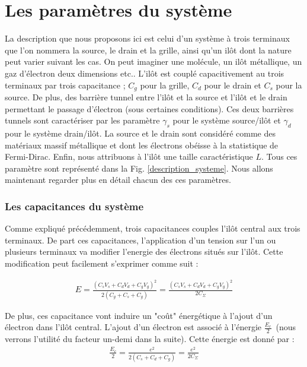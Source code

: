 \section{Les paramètres du système}
La description que nous proposons ici est celui d'un système à trois terminaux que l'on nommera la source, le drain et la grille, ainsi qu'un il\^ot dont la nature peut varier suivant les cas. On peut imaginer une molécule, un il\^ot métallique, un gaz d'électron deux dimensions etc.. L'il\^ot est couplé capacitivement au trois terminaux par trois capacitance ; $C_g$ pour la grille, $C_d$ pour le drain et $C_s$ pour la source. De plus, des barrière tunnel entre l'il\^ot et la source et l'il\^ot et le drain permettant le passage d'électron (sous certaines conditions). Ces deux barrières tunnels sont caractériser par les paramètre $\gamma_s$ pour le système source/il\^ot et $\gamma_d$ pour le système drain/il\^ot. La source et le drain sont considéré comme des matériaux massif métallique et dont les électrons obéisse à la statistique de Fermi-Dirac. Enfin, nous attribuons à l'il\^ot une taille caractéristique $L$. Tous ces paramètre sont représenté dans la Fig. \ref{description_systeme}. Nous allons maintenant regarder plus en détail chacun des ces paramètres.

\subsubsection{Les capacitances du système}
Comme expliqué précédemment, trois capacitances couples l'il\^ot central aux trois terminaux. De part ces capacitances, l'application d'un tension sur l'un ou plusieurs terminaux va modifier l'energie des électrons situés sur l'ilôt. Cette modification peut facilement s'exprimer comme suit :

\begin{eqnarray}
E = \frac{(C_sV_s + C_dV_d + C_gV_g)^2}{2(C_g + C_s + C_g)}=\frac{(C_sV_s + C_dV_d + C_gV_g)^2}{2C_{\Sigma}} \nonumber
\end{eqnarray}

De plus, ces capacitance vont induire un "co\^ut" énergétique à l'ajout d'un électron dans l'il\^ot central. L'ajout d'un électron est associé à l'énergie $\frac{E_c}{2}$~(nous verrons l'utilité du facteur un-demi dans la suite). Cette énergie est donné par :
\begin{eqnarray}
\frac{E_c}{2} = \frac{e^2}{2(C_s+C_d+C_g)}=\frac{e^2}{2C_{\Sigma}} \nonumber
\end{eqnarray}


